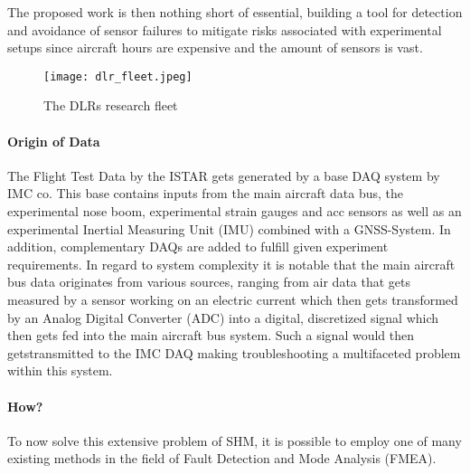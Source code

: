 The proposed work is then nothing short of essential, building a tool for detection and avoidance of sensor failures to mitigate risks associated with experimental setups since aircraft hours are expensive and the amount of sensors is vast.

\begin{figure}
    \centering
    \texttt{[image: dlr\_fleet.jpeg]}
    \caption{The DLRs research fleet \cite{dlr_dlr-fleet_2018}}
    \label{fig:dlr_fleet}
\end{figure}

\paragraph{Origin of Data}
The Flight Test Data by the ISTAR gets generated by a base DAQ system by IMC co. This base contains inputs from the main aircraft data bus, the experimental nose boom, experimental strain gauges and acc sensors as well as an experimental Inertial Measuring Unit (IMU) combined with a GNSS-System.
In addition, complementary DAQs are added to fulfill given experiment requirements.
In regard to system complexity it is notable that the main aircraft bus data originates from various sources, ranging from air data that gets measured by a sensor working on an electric current which then gets transformed by an Analog Digital Converter (ADC) into a digital, discretized signal which then gets fed into the main aircraft bus system. Such a signal would then getstransmitted to the IMC DAQ making troubleshooting a multifaceted problem within this system.




\paragraph{How?}
To now solve this extensive problem of SHM, it is possible to employ one of many existing methods in the field of Fault Detection and Mode Analysis (FMEA).

